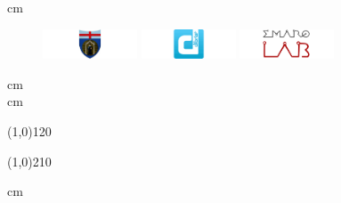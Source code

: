 \begin{frame}[plain,c]
	\begin{center}
			 cm
			\begin{figure}[htp]
				  \centering
				  \includegraphics[width=0.25\textwidth]{./figures/logo/unige.pdf}
				  \hskip 0.5cm
				  \includegraphics[width=0.25\textwidth]{./figures/logo/dibris2.pdf}
				  \hskip 0.5cm
				  \includegraphics[width=0.25\textwidth]{./figures/logo/emaroLab.pdf}
			\end{figure}
			 cm
			{\small \theInstitute \\}
			 cm
	\end{center}

	\vfill

	\line(1,0){120}
	\begin{flushleft}\em\textsc{\textbf{\Large\theTitle}}\end{flushleft}
	\begin{center}\em\textsc{\textit{\large\theShortTitle}}\end{center}
	\line(1,0){210}  

	\vfill

	\halfPage{		
	     \begin{flushleft}\theAuthor\end{flushleft}
	}{
	     \begin{flushright}\theCooathor\end{flushright}
	}
	 cm 
	\vfill			
	\centering\theDate
\end{frame}

